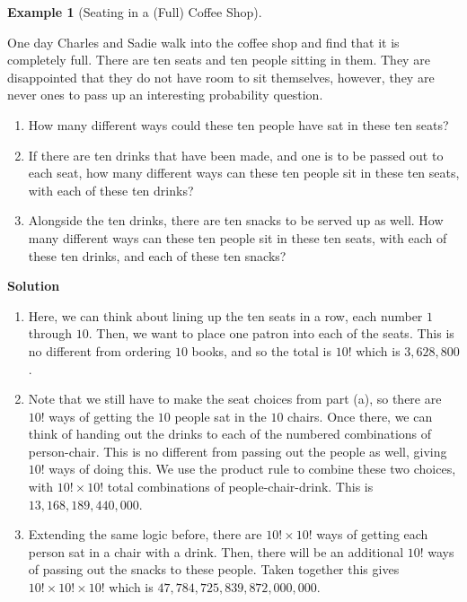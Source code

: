 \documentclass[
  letterpaper,
  DIV=11,
  numbers=noendperiod]{scrreprt}
\providecommand{\tightlist}{%
  \setlength{\itemsep}{0pt}\setlength{\parskip}{0pt}}\usepackage{longtable,booktabs,array}
\theoremstyle{definition}
\theoremstyle{definition}
\newtheorem{example}{Example}[chapter]
\theoremstyle{definition}
\theoremstyle{remark}
\begin{document}
\begin{example}[Seating in a (Full) Coffee
Shop]\protect\hypertarget{exm-factorial}{}\label{exm-factorial}

One day Charles and Sadie walk into the coffee shop and find that it is
completely full. There are ten seats and ten people sitting in them.
They are disappointed that they do not have room to sit themselves,
however, they are never ones to pass up an interesting probability
question.

\begin{enumerate}
\def\labelenumi{\alph{enumi}.}
\tightlist
\item
  How many different ways could these ten people have sat in these ten
  seats?
\item
  If there are ten drinks that have been made, and one is to be passed
  out to each seat, how many different ways can these ten people sit in
  these ten seats, with each of these ten drinks?
\item
  Alongside the ten drinks, there are ten snacks to be served up as
  well. How many different ways can these ten people sit in these ten
  seats, with each of these ten drinks, and each of these ten snacks?
\end{enumerate}

\begin{tcolorbox}[enhanced jigsaw, colback=white, colframe=quarto-callout-color-frame, arc=.35mm, leftrule=.75mm, rightrule=.15mm, opacityback=0, breakable, bottomrule=.15mm, left=2mm, toprule=.15mm]

\vspace{-3mm}\textbf{Solution}\vspace{3mm}

\begin{enumerate}
\def\labelenumi{\alph{enumi}.}
\item
  Here, we can think about lining up the ten seats in a row, each number
  \(1\) through \(10\). Then, we want to place one patron into each of
  the seats. This is no different from ordering \(10\) books, and so the
  total is \(10!\) which is \(3,628,800\).
\item
  Note that we still have to make the seat choices from part (a), so
  there are \(10!\) ways of getting the \(10\) people sat in the \(10\)
  chairs. Once there, we can think of handing out the drinks to each of
  the numbered combinations of person-chair. This is no different from
  passing out the people as well, giving \(10!\) ways of doing this. We
  use the product rule to combine these two choices, with
  \(10!\times 10!\) total combinations of people-chair-drink. This is
  \(13,168,189,440,000\).
\item
  Extending the same logic before, there are \(10!\times 10!\) ways of
  getting each person sat in a chair with a drink. Then, there will be
  an additional \(10!\) ways of passing out the snacks to these people.
  Taken together this gives \(10!\times 10!\times 10!\) which is
  \(47,784,725,839,872,000,000\).\footnotemark{}
\end{enumerate}


\end{tcolorbox}
\end{example}
\end{document}
